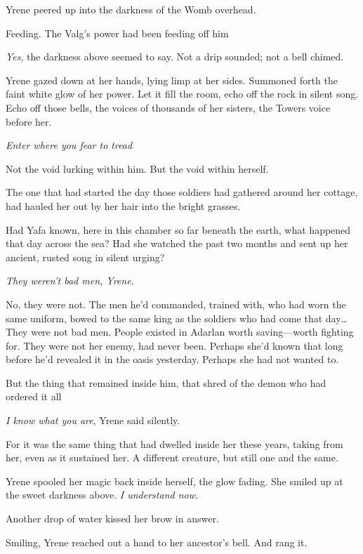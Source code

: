 Yrene peered up into the darkness of the Womb overhead.

Feeding.
The Valg's power had been feeding off him 

\emph{Yes}, the darkness above seemed to say.
Not a drip sounded; not a bell chimed.

Yrene gazed down at her hands, lying limp at her sides.
Summoned forth the faint white glow of her power.
Let it fill the room, echo off the rock in silent song.
Echo off those bells, the voices of thousands of her sisters, the Towers voice before her.

\emph{Enter where you fear to tread }

Not the void lurking within him.
But the void within herself.

The one that had started the day those soldiers had gathered around her cottage, had hauled her out by her hair into the bright grasses.

Had Yafa known, here in this chamber so far beneath the earth, what happened that day across the sea?
Had she watched the past two months and sent up her ancient, rusted song in silent urging?

\emph{They weren't bad men, Yrene.}

No, they were not.
The men he'd commanded, trained with, who had worn the same uniform, bowed to the same king as the soldiers who had come that day\ldots They were not bad men.
People existed in Adarlan worth saving---worth fighting for.
They were not her enemy, had never been.
Perhaps she'd known that long before he'd revealed it in the oasis yesterday.
Perhaps she had not wanted to.

But the thing that remained inside him, that shred of the demon who had ordered it all 

\emph{I know what you are}, Yrene said silently.

For it was the same thing that had dwelled inside her these years, taking from her, even as it sustained her.
A different creature, but still one and the same.

Yrene spooled her magic back inside herself, the glow fading.
She smiled up at the sweet darkness above.
\emph{I understand now.}

Another drop of water kissed her brow in answer.

Smiling, Yrene reached out a hand to her ancestor's bell.
And rang it.

